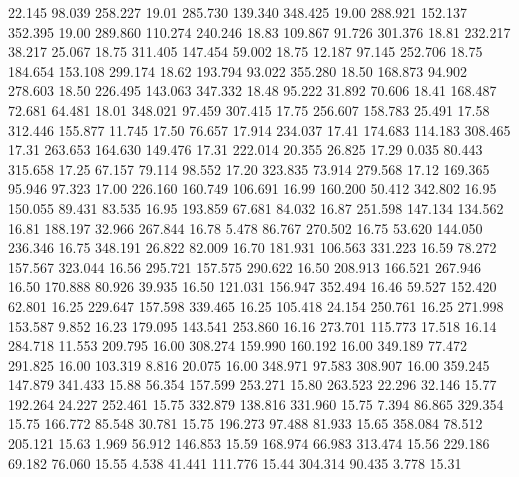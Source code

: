   22.145   98.039  258.227        19.01
 285.730  139.340  348.425        19.00
 288.921  152.137  352.395        19.00
 289.860  110.274  240.246        18.83
 109.867   91.726  301.376        18.81
 232.217   38.217   25.067        18.75
 311.405  147.454   59.002        18.75
  12.187   97.145  252.706        18.75
 184.654  153.108  299.174        18.62
 193.794   93.022  355.280        18.50
 168.873   94.902  278.603        18.50
 226.495  143.063  347.332        18.48
  95.222   31.892   70.606        18.41
 168.487   72.681   64.481        18.01
 348.021   97.459  307.415        17.75
 256.607  158.783   25.491        17.58
 312.446  155.877   11.745        17.50
  76.657   17.914  234.037        17.41
 174.683  114.183  308.465        17.31
 263.653  164.630  149.476        17.31
 222.014   20.355   26.825        17.29
   0.035   80.443  315.658        17.25
  67.157   79.114   98.552        17.20
 323.835   73.914  279.568        17.12
 169.365   95.946   97.323        17.00
 226.160  160.749  106.691        16.99
 160.200   50.412  342.802        16.95
 150.055   89.431   83.535        16.95
 193.859   67.681   84.032        16.87
 251.598  147.134  134.562        16.81
 188.197   32.966  267.844        16.78
   5.478   86.767  270.502        16.75
  53.620  144.050  236.346        16.75
 348.191   26.822   82.009        16.70
 181.931  106.563  331.223        16.59
  78.272  157.567  323.044        16.56
 295.721  157.575  290.622        16.50
 208.913  166.521  267.946        16.50
 170.888   80.926   39.935        16.50
 121.031  156.947  352.494        16.46
  59.527  152.420   62.801        16.25
 229.647  157.598  339.465        16.25
 105.418   24.154  250.761        16.25
 271.998  153.587    9.852        16.23
 179.095  143.541  253.860        16.16
 273.701  115.773   17.518        16.14
 284.718   11.553  209.795        16.00
 308.274  159.990  160.192        16.00
 349.189   77.472  291.825        16.00
 103.319    8.816   20.075        16.00
 348.971   97.583  308.907        16.00
 359.245  147.879  341.433        15.88
  56.354  157.599  253.271        15.80
 263.523   22.296   32.146        15.77
 192.264   24.227  252.461        15.75
 332.879  138.816  331.960        15.75
   7.394   86.865  329.354        15.75
 166.772   85.548   30.781        15.75
 196.273   97.488   81.933        15.65
 358.084   78.512  205.121        15.63
   1.969   56.912  146.853        15.59
 168.974   66.983  313.474        15.56
 229.186   69.182   76.060        15.55
   4.538   41.441  111.776        15.44
 304.314   90.435    3.778        15.31
